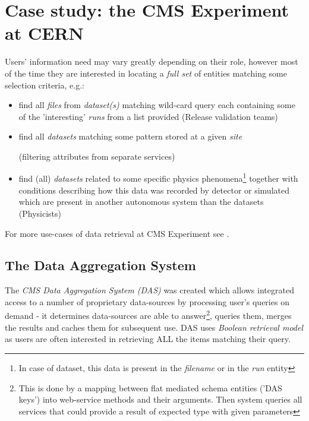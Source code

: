 \documentclass[a4paper,11pt]{article}
\begin{document}


\section{Case study: the CMS Experiment at CERN}
Users' information need may vary greatly depending on their role, however most of the time they are interested in locating a \textit{full set} of entities matching some selection criteria, e.g.:
   \begin{itemize}
  		\item find all \textit{files} from \textit{dataset(s)} matching wild-card query each containing some of the 'interesting' \textit{runs} from a list provided (Release validation teams)
         \item find all \textit{datasets} matching some pattern stored at a given \textit{site} 
         	  \begin{small}(filtering attributes from separate services)\end{small}
         \item find (all) \textit{datasets} related to some specific physics phenomena\footnote{In case of dataset, this data is present in the \textit{filename} or in the \textit{run} entity} together with conditions describing how this data was recorded by detector or simulated which are present in another autonomous system than the datasets (Physicists)
   \end{itemize}                		

For more use-cases of data retrieval at CMS Experiment see \cite{CMS_data08}.

\subsection*{The Data Aggregation System}

The \textit{CMS Data Aggregation System (DAS)}\cite{Kuznetsov2010, Kuznetsov2011} was created which allows integrated access to a number of proprietary data-sources by processing user's queries on demand - it determines  data-sources are able to answer\footnote{This is done by a mapping between flat mediated schema entities ('DAS keys') into web-service methods and their arguments. Then system queries all services that could provide a result of expected type with given parameters}, queries them, merges the results and caches them for subsequent use. DAS uses \textit{Boolean retrieval model} as users are often interested in retrieving ALL the items matching their query.
\end{document}
